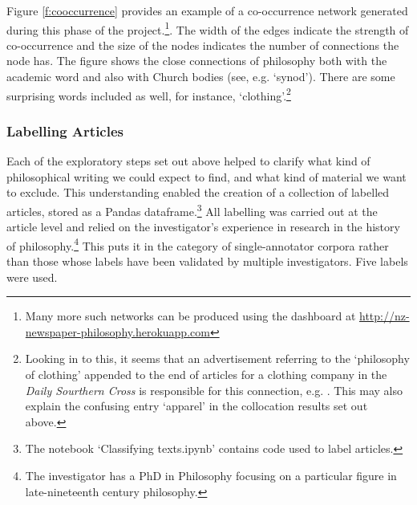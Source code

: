 \documentclass{article}
\begin{document}
Figure \ref{f:cooccurrence} provides an example of a co-occurrence network generated during this phase of the project.\footnote{Many more such networks can be produced using the dashboard at \url{http://nz-newspaper-philosophy.herokuapp.com}}. The width of the edges indicate the strength of co-occurrence and the size of the nodes indicates the number of connections the node has. The figure shows the close connections of philosophy both with the academic word and also with Church bodies (see, e.g. `synod'). There are some surprising words included as well, for instance, `clothing'.\footnote{Looking in to this, it seems that an advertisement referring to the `philosophy of clothing' appended to the end of articles for a clothing company in the \textit{Daily Sourthern Cross} is responsible for this connection, e.g. \cite{clothing-example}. This may also explain the confusing entry `apparel' in the collocation results set out above.}

\subsubsection{Labelling Articles}\label{s:labelling}

Each of the exploratory steps set out above helped to clarify what kind of philosophical writing we could expect to find, and what kind of material we want to exclude. This understanding enabled the creation of a collection of labelled articles, stored as a Pandas dataframe.\footnote{The notebook `Classifying texts.ipynb' contains code used to label articles.}  All labelling was carried out at the article level and relied on the investigator's experience in research in the history of philosophy.\footnote{The investigator has a PhD in Philosophy focusing on a particular figure in late-nineteenth century philosophy.} This puts it in the category of single-annotator corpora rather than those whose labels have been validated by multiple investigators. Five labels were used.
\end{document}
